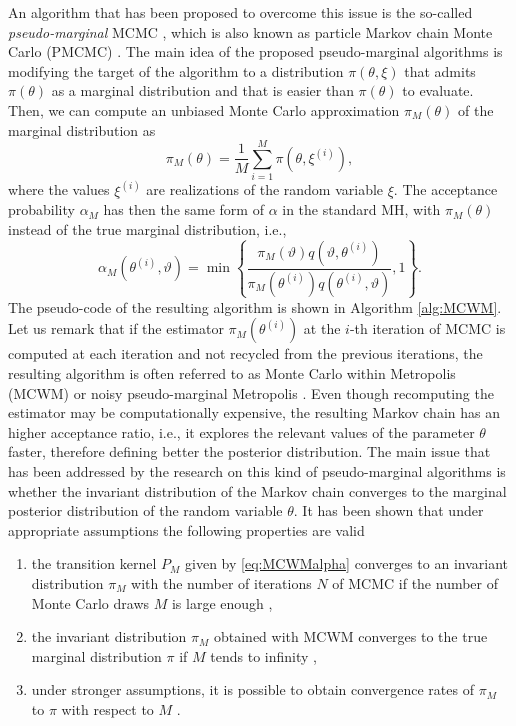 An algorithm that has been proposed to overcome this issue is the so-called \textit{pseudo-marginal} MCMC \cite{DPD15}, which is also known as particle Markov chain Monte Carlo (PMCMC) \cite{ADH10}. The main idea of the proposed pseudo-marginal algorithms is modifying the target of the algorithm to a distribution $\pi(\theta, \xi)$ that admits $\pi(\theta)$ as a marginal distribution and that is easier than $\pi(\theta)$ to evaluate. Then, we can compute an unbiased Monte Carlo approximation $\pi_M(\theta)$ of the marginal distribution as
\begin{equation}\label{eq:MCWMestimators}
	\pi_M(\theta) = \frac{1}{M} \sum_{i = 1}^{M} \pi(\theta, \xi^{(i)}),
\end{equation}
where the values $\xi^{(i)}$ are realizations of the random variable $\xi$. The acceptance probability $\alpha_M$ has then the same form of $\alpha$ in the standard MH, with $\pi_M(\theta)$ instead of the true marginal distribution, i.e.,
\begin{equation}\label{eq:MCWMalpha}
	\alpha_M(\theta^{(i)}, \vartheta) = \min\left\{\frac{\pi_M(\vartheta)q(\vartheta, \theta^{(i)})}{\pi_M(\theta^{(i)})q(\theta^{(i)}, \vartheta)}, 1\right\}.
\end{equation}
The pseudo-code of the resulting algorithm is shown in Algorithm \ref{alg:MCWM}. Let us remark that if the estimator $\pi_M(\theta^{(i)})$ at the $i$-th iteration of MCMC is computed at each iteration and not recycled from the previous iterations, the resulting algorithm is often referred to as Monte Carlo within Metropolis (MCWM) \cite{AnR09} or noisy pseudo-marginal Metropolis \cite{MLR16}. Even though recomputing the estimator may be computationally expensive, the resulting Markov chain has an higher acceptance ratio, i.e., it explores the relevant values of the parameter $\theta$ faster, therefore defining better the posterior distribution. The main issue that has been addressed by the research on this kind of pseudo-marginal algorithms is whether the invariant distribution of the Markov chain converges to the marginal posterior distribution of the random variable $\theta$. It has been shown \cite{AnR09, MLR16} that under appropriate assumptions the following properties are valid
\begin{enumerate}
	\item the transition kernel $P_M$ given by \eqref{eq:MCWMalpha} converges to an invariant distribution $\pi_M$ with the number of iterations $N$ of MCMC if the number of Monte Carlo draws $M$ is large enough \cite[Theorem 9]{AnR09},
	\item the invariant distribution $\pi_M$ obtained with MCWM converges to the true marginal distribution $\pi$ if $M$ tends to infinity \cite[Theorem 4.1]{MLR16},
	\item under stronger assumptions, it is possible to obtain convergence rates of $\pi_M$ to $\pi$ with respect to $M$ \cite[Theorem 4.2 and Proposition 4.1]{MLR16}.
\end{enumerate}
